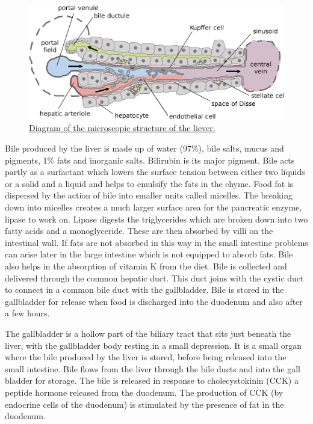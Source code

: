 \begin{figure}

{\centering \includegraphics[width=0.7\linewidth]{./figures/digestive/Hepatic_structure2} 

}

\caption{\href{https://commons.wikimedia.org/wiki/File:Hepatic_structure2.svg}{Diagram of the microscopic structure of the liever.}}\label{fig:microliver}
\end{figure}

Bile produced by the liver is made up of water (97\%), bile salts, mucus and pigments, 1\% fats and inorganic salts. Bilirubin is its major pigment. Bile acts partly as a surfactant which lowers the surface tension between either two liquids or a solid and a liquid and helps to emulsify the fats in the chyme. Food fat is dispersed by the action of bile into smaller units called micelles. The breaking down into micelles creates a much larger surface area for the pancreatic enzyme, lipase to work on. Lipase digests the triglycerides which are broken down into two fatty acids and a monoglyceride. These are then absorbed by villi on the intestinal wall. If fats are not absorbed in this way in the small intestine problems can arise later in the large intestine which is not equipped to absorb fats. Bile also helps in the absorption of vitamin K from the diet. Bile is collected and delivered through the common hepatic duct. This duct joins with the cystic duct to connect in a common bile duct with the gallbladder. Bile is stored in the gallbladder for release when food is discharged into the duodenum and also after a few hours.

The gallbladder is a hollow part of the biliary tract that sits just beneath the liver, with the gallbladder body resting in a small depression. It is a small organ where the bile produced by the liver is stored, before being released into the small intestine. Bile flows from the liver through the bile ducts and into the gall bladder for storage. The bile is released in response to cholecystokinin (CCK) a peptide hormone released from the duodenum. The production of CCK (by endocrine cells of the duodenum) is stimulated by the presence of fat in the duodenum.

